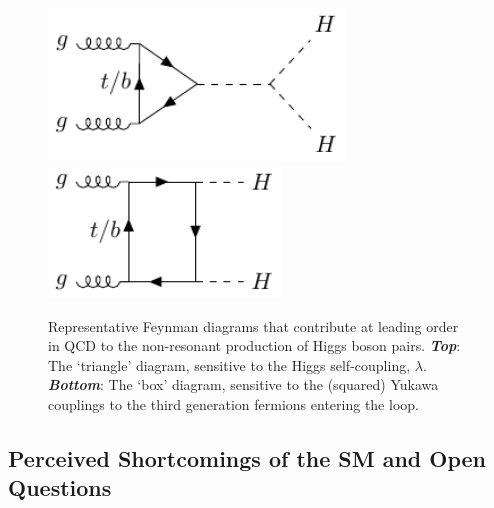 \begin{figure}[!htb]
    \begin{center}
        \includegraphics[width=0.7\textwidth]{figures/search_hh/feynman_diagrams/fdiagram_triangle}
        \includegraphics[width=0.55\textwidth]{figures/search_hh/feynman_diagrams/fdiagram_box}
        \caption{
            Representative Feynman diagrams that contribute at leading order in QCD to the non-resonant
            production of Higgs boson pairs.
            {\textbf{\textit{Top}}}: The `triangle' diagram, sensitive to the Higgs self-coupling, $\lambda$.
            {\textbf{\textit{Bottom}}}: The `box' diagram, sensitive to the (squared) Yukawa couplings to the third generation
            fermions entering the loop.
        }
        \label{fig:hh_feynman}
    \end{center}
\end{figure}

%
%
\FloatBarrier
\subsection{Perceived Shortcomings of the SM and Open Questions}
\label{sec:sm_shortcomings}

